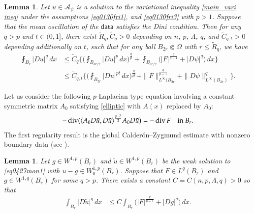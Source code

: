 \documentclass[reqno]{amsart}
\numberwithin{equation}{section}
\theoremstyle{plain}
\newtheorem{lemma}[theorem]{Lemma}
\theoremstyle{definition}
\theoremstyle{remark}
\DeclareMathOperator{\dv}{div}
\providecommand{\Biggset}[1]{\Biggl\{#1\Biggr\}}
\providecommand{\abs}[1]{\lvert#1\rvert}
\providecommand{\ip}[1]{\langle#1\rangle}
\begin{document}
\begin{lemma}\label{lem:CZ_variational inequality}
Let $u\in \mathcal{A}_\psi$ is a solution to  the variational inequality \eqref{main_vari ineq} under the assumptions  \eqref{eq0130fri1}, and \eqref{eq0130fri3} with $p>1$. Suppose that the mean oscillation of the  $\mathsf{data}$ satisfies the Dini condition. 
Then for any $q>p$ and $t\in(0,1]$, there exist $\tilde R_q, \tilde C_q > 0$ depending on $n$, $p$, $\Lambda$, $q$, and $\tilde C_{q,t} > 0$ depending additionally on $t$, such that for any ball $B_{2r}\Subset \Omega$ with $r\le \tilde R_q$, we have
\begin{align}\label{eq0128wed2} 
\fint_{B_r}\abs{Du}^q\, dx &\leq  \tilde C_{q} \Biggset{     \bigg( \fint_{B_{3r/2}} \abs{Du}^{p} \, dx\bigg)^\frac{q}{p}+ \fint_{B_{3r/2}}  \big( \abs{F}^{\frac{q}{p-1}}  +\abs{D\psi}^q  \big)\, dx} \nonumber\\
&\leq  \tilde C_{q,t} \Biggset{     \bigg( \fint_{B_{2r}} \abs{Du}^{pt} \, dx\bigg)^\frac{q}{pt}+ \|F\|_{L^\infty(B_{2r}}^{\frac{q}{p-1}}  +\|D\psi\|_{L^\infty(B_{2r})}^q }.%
\end{align}  
\end{lemma}
 
Let us consider the following $p$-Laplacian type equation involving a constant symmetric matrix $A_0$ satisfying \eqref{elliptic} with $A(x)$ replaced by $A_0$:
\begin{equation} \label{eq0427mon1}
-\dv ( \ip{A_0 D \tilde{u}, D\tilde{u} }^{\frac{p-2}{2}}A_0 D\tilde{u})=-\dv F \quad\hbox{in $B_r$}.
\end{equation}
The first regularity result is the global Calder\'{o}n--Zygmund estimate with nonzero boundary data (see \cite[Theorem~5.1]{KZ01}).
\begin{lemma}
Let $g\in W^{1,p}(B_r)$ and $\tilde u\in W^{1,p}(B_r)$ be the weak solution to \eqref{eq0427mon1} with $u-g\in W^{1,p}_0(B_r)$.  Suppose that $F\in L^q(B_r)$ and $g\in W^{1,q}(B_r)$ for some $q>p$.
There exists a constant $C=C(n,p,\Lambda,q)>0$ so that
\begin{align}\label{eq0410fri1}
\int_{B_r} \abs{D\tilde{u}}^q\, dx &\leq  C\int_{B_r}  \big( \abs{F}^{\frac{q}{p-1}}  +\abs{Dg}^q  \big)\, dx   .
\end{align}
 
\end{lemma}
 
\end{document}
